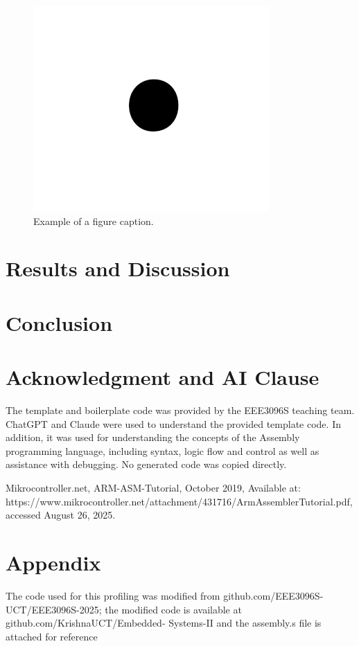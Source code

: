 \documentclass[conference]{IEEEtran}
\begin{document}
\begin{figure}[htbp]
\centerline{\includegraphics{fig1.png}}
\caption{Example of a figure caption.}
\label{fig}
\end{figure}

\section{Results and Discussion}



\section{Conclusion}




\section*{Acknowledgment and AI Clause}

The template and boilerplate code was provided by the EEE3096S teaching team. ChatGPT and Claude were used to understand the provided template code. In addition, it was used for understanding the concepts of the Assembly programming language, including syntax, logic flow and control as well as assistance with debugging. No generated code was copied directly.

\begin{thebibliography}{00}
Mikrocontroller.net,
ARM-ASM-Tutorial,
October 2019,
Available at: https://www.mikrocontroller.net/attachment/431716/ArmAssemblerTutorial.pdf,
accessed August 26, 2025.

\end{thebibliography}

\section*{Appendix}
The code used for this profiling was modified from
github.com/EEE3096S-UCT/EEE3096S-2025; the modified
code is available at github.com/KrishnaUCT/Embedded-
Systems-II and the assembly.s file is attached for reference

\vspace{12pt}
\end{document}
